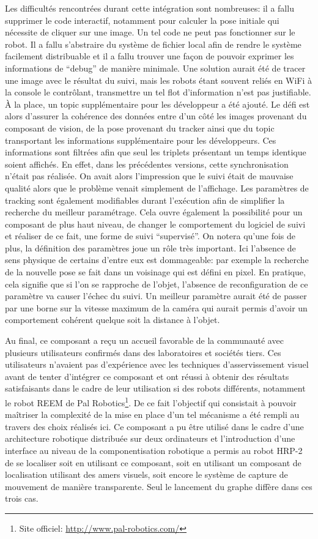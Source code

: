 Les difficultés rencontrées durant cette intégration sont nombreuses:
il a fallu supprimer le code interactif, notamment pour calculer la
pose initiale qui nécessite de cliquer sur une image. Un tel code ne
peut pas fonctionner sur le robot. Il a fallu s'abstraire du système
de fichier local afin de rendre le système facilement distribuable et
il a fallu trouver une façon de pouvoir exprimer les informations de
``debug'' de manière minimale. Une solution aurait été de tracer une
image avec le résultat du suivi, mais les robots étant souvent reliés
en WiFi à la console le contrôlant, transmettre un tel flot
d'information n'est pas justifiable. À la place, un topic
supplémentaire pour les développeur a été ajouté. Le défi est alors
d'assurer la cohérence des données entre d'un côté les images
provenant du composant de vision, de la pose provenant du tracker
ainsi que du topic transportant les informations supplémentaire pour
les développeurs. Ces informations sont filtrées afin que seul les
triplets présentant un temps identique soient affichés. En effet, dans
les précédentes versions, cette synchronisation n'était pas
réalisée. On avait alors l'impression que le suivi était de mauvaise
qualité alors que le problème venait simplement de l'affichage. Les
paramètres de tracking sont également modifiables durant l'exécution
afin de simplifier la recherche du meilleur paramétrage. Cela ouvre
également la possibilité pour un composant de plus haut niveau, de
changer le comportement du logiciel de suivi et réaliser de ce fait,
une forme de suivi ``supervisé''. On notera qu'une fois de plus, la
définition des paramètres joue un rôle très important. Ici l'absence
de sens physique de certains d'entre eux est dommageable: par exemple
la recherche de la nouvelle pose se fait dans un voisinage qui est
défini en pixel. En pratique, cela signifie que si l'on se rapproche
de l'objet, l'absence de reconfiguration de ce paramètre va causer
l'échec du suivi. Un meilleur paramètre aurait été de passer par une
borne sur la vitesse maximum de la caméra qui aurait permis d'avoir un
comportement cohérent quelque soit la distance à l'objet.


Au final, ce composant a reçu un accueil favorable de la communauté
avec plusieurs utilisateurs confirmés dans des laboratoires et
sociétés tiers. Ces utilisateurs n'avaient pas d'expérience avec les
techniques d'asservissement visuel avant de tenter d'intégrer ce
composant et ont réussi à obtenir des résultats satisfaisants dans le
cadre de leur utilisation si des robots différents, notamment le robot
REEM de Pal Robotics\footnote{Site officiel:
  \url{http://www.pal-robotics.com/}}. De ce fait l'objectif qui
consistait à pouvoir maîtriser la complexité de la mise en place d'un
tel mécanisme a été rempli au travers des choix réalisés ici. Ce
composant a pu être utilisé dans le cadre d'une architecture robotique
distribuée sur deux ordinateurs et l'introduction d'une interface au
niveau de la componentisation robotique a permis au robot HRP-2 de se
localiser soit en utilisant ce composant, soit en utilisant un
composant de localisation utilisant des amers visuels, soit encore
le système de capture de mouvement de manière transparente. Seul le
lancement du graphe diffère dans ces trois cas.


